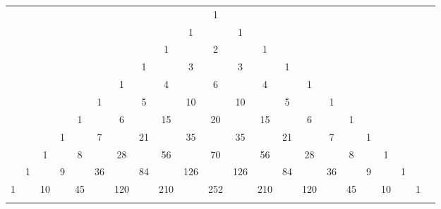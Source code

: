 \begin{tabular}{rccccccccccccccccccccc}
   &    &    &    &    &    &    &    &    &    &  1\\\noalign{\smallskip\smallskip}
   &    &    &    &    &    &    &    &    &  1 &    &  1\\\noalign{\smallskip\smallskip}
   &    &    &    &    &    &    &    &  1 &    &  2 &    &  1\\\noalign{\smallskip\smallskip}
   &    &    &    &    &    &    &  1 &    &  3 &    &  3 &    &  1\\\noalign{\smallskip\smallskip}
   &    &    &    &    &    &  1 &    &  4 &    &  6 &    &  4 &    &  1\\\noalign{\smallskip\smallskip}
   &    &    &    &    &  1 &    &  5 &    & 10 &    & 10 &    &  5 &    &  1\\\noalign{\smallskip\smallskip}
   &    &    &    &  1 &    &  6 &    & 15 &    & 20 &    & 15 &    &  6 &    &  1\\\noalign{\smallskip\smallskip}
   &    &    &  1 &    &  7 &    & 21 &    & 35 &    & 35 &    & 21 &    &  7 &    &  1\\\noalign{\smallskip\smallskip}
   &    &  1 &    &  8 &    & 28 &    & 56 &    & 70 &    & 56 &    & 28 &    &  8 &    &  1\\\noalign{\smallskip\smallskip}
   &  1 &    &  9 &    & 36 &    & 84 &    & 126 &    & 126 &    & 84 &    & 36 &    &  9 &    &  1\\\noalign{\smallskip\smallskip}
 1 &    & 10 &    & 45 &    & 120 &    & 210 &    & 252 &    & 210 &    & 120 &    & 45 &    & 10 &    &  1\\\noalign{\smallskip\smallskip}
\end{tabular}
